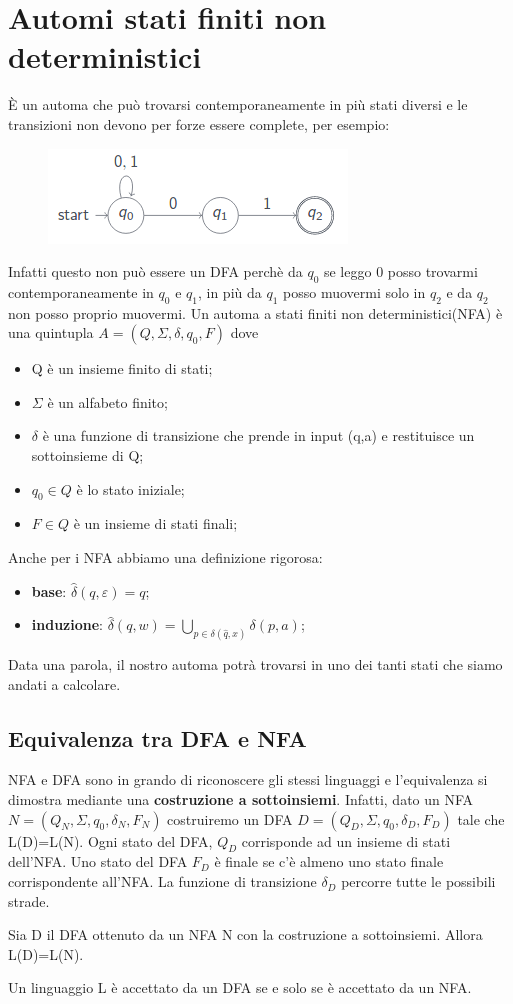 \chapter{Automi stati finiti non deterministici}
È un automa che può trovarsi contemporaneamente in più stati diversi e le 
transizioni non devono per forze essere complete, per esempio: 

\begin{figure}[h]
\centering 
\includegraphics[scale=0.5]{Immagini/NFA.png}
\end{figure}

Infatti questo non può essere un DFA perchè da $q_0$ se leggo 0 posso trovarmi
contemporaneamente in $q_0$ e $q_1$, in più da $q_1$ posso muovermi solo in $q_2$ 
e da $q_2$ non posso proprio muovermi.
Un automa a stati finiti non deterministici(NFA) è una quintupla $A=(Q, \Sigma, 
\delta, q_0, F)$ dove
\begin{itemize}
\item Q è un insieme finito di stati;
\item $\Sigma$ è un alfabeto finito;
\item $\delta$ è una funzione di transizione che prende in input (q,a) e 
restituisce un sottoinsieme di Q;
\item $q_0 \in Q$ è lo stato iniziale;
\item $F \in Q$ è un insieme di stati finali;
\end{itemize}
Anche per i NFA abbiamo una definizione rigorosa:
\begin{itemize}
\item \textbf{base}: $\widehat{\delta}(q, \varepsilon)={q}$;
\item \textbf{induzione}: $\widehat{\delta}(q,w)=\bigcup_{p \in \delta 
(\widehat{q},x)}^{} \delta(p,a)$;
\end{itemize}
Data una parola, il nostro automa potrà trovarsi in uno dei tanti stati
che siamo andati a calcolare.

\section{Equivalenza tra DFA e NFA}
NFA e DFA sono in grando di riconoscere gli stessi linguaggi e l'equivalenza si
dimostra mediante una \textbf{costruzione a sottoinsiemi}. Infatti, dato un NFA
$N=(Q_N, \Sigma, q_0, \delta_N, F_N)$ costruiremo un DFA $D=(Q_D, \Sigma, {q_0}, 
\delta_D, F_D)$ tale che L(D)=L(N).
Ogni stato del DFA, $Q_D$ corrisponde ad un insieme di stati dell'NFA.
Uno stato del DFA $F_D$ è finale se c'è almeno uno stato finale corrispondente
all'NFA. La funzione di transizione $\delta_D$ percorre tutte le possibili strade.
\begin{thm}
Sia D il DFA ottenuto da un NFA N con la costruzione a sottoinsiemi. Allora
L(D)=L(N).
\end{thm}

\begin{thm}
Un linguaggio L è accettato da un DFA se e solo se è accettato da un NFA.
\end{thm}
